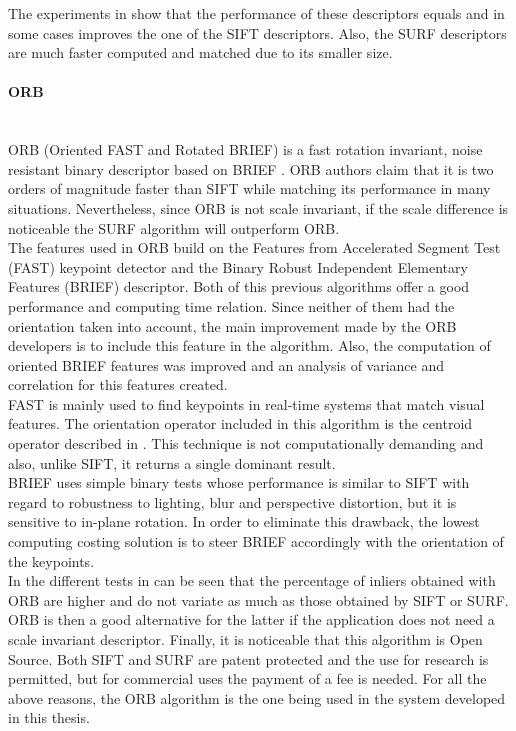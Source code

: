 The experiments in \cite{surf} show that the performance of these descriptors equals and in some cases improves the one of the SIFT descriptors. Also, the SURF descriptors are much faster computed and matched due to its smaller size. 


\paragraph{ORB}\mbox{}\\

ORB (Oriented FAST and Rotated BRIEF) is a fast rotation invariant, noise resistant binary descriptor based on BRIEF \cite{orb}.
ORB authors claim that it is two orders of magnitude faster than SIFT while matching its performance in many situations. 
Nevertheless, since ORB is not scale invariant, if the scale difference is noticeable the SURF algorithm will outperform ORB. 
\\

The features used in ORB build on the Features from Accelerated Segment Test (FAST) \cite{fast} keypoint detector and the Binary Robust Independent Elementary Features (BRIEF) \cite{brief} descriptor. Both of this previous algorithms offer a good performance and computing time relation. Since neither of them had the orientation taken into account, the main improvement made by the ORB developers is to include this feature in the algorithm. Also, the computation of oriented BRIEF features was improved and an analysis of variance and correlation for this features created. 
\\

FAST is mainly used to find keypoints in real-time systems that match visual features. The orientation operator included in this algorithm is the centroid operator described in \cite{orientation_corners}. This technique is not computationally demanding and also, unlike SIFT, it returns a single dominant result. 
\\

BRIEF uses simple binary tests whose performance is similar to SIFT with regard to robustness to lighting, blur and perspective distortion, but it is sensitive to in-plane rotation. In order to eliminate this drawback, the lowest computing costing solution is to steer BRIEF accordingly with the orientation of the keypoints. 
\\

In the different tests in \cite{orb} can be seen that the percentage of inliers obtained with ORB are higher and do not variate as much as those obtained by SIFT or SURF. 
ORB is then a good alternative for the latter if the application does not need a scale invariant descriptor. 
Finally, it is noticeable that this algorithm is Open Source.
Both SIFT and SURF are patent protected and the use for research is permitted, but for commercial uses the payment of a fee is needed. %
For all the above reasons, the ORB algorithm is the one being used in the system developed in this thesis. 


